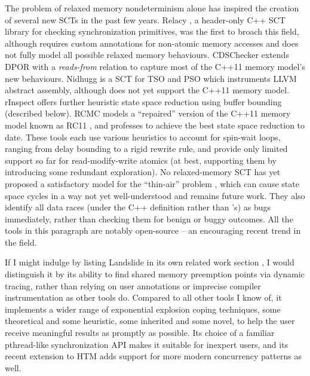 The problem of relaxed memory nondeterminism alone has inspired the creation of several new SCTs in the past few years.
Relacy \cite{relacy}, a header-only C++ SCT library for checking synchronization primitives,
was the first to broach this field,
although requires custom annotations for non-atomic memory accesses
and
does not fully model all possible relaxed memory behaviours.
CDSChecker \cite{cdschecker} extends DPOR with a {\em reads-from} relation
to capture most of the C++11 memory model's new behaviours.
Nidhugg \cite{nidhugg} is a SCT for TSO and PSO which instruments LLVM abstract assembly,
although does not yet support the C++11 memory model.
rInspect \cite{tsopso}
offers further heuristic state space reduction using buffer bounding (described below).
RCMC \cite{rcmc} models a ``repaired'' version of the C++11 memory model known as RC11 \cite{rc11},
and professes to achieve the best state space reduction to date.
These tools each use various heuristics to account for spin-wait loops,
ranging from delay bounding \cite{bpor} to a rigid rewrite rule,
and provide only limited support so far for read-modify-write atomics
(at best, supporting them by introducing %
some redundant exploration).
%
No relaxed-memory SCT has yet proposed a satisfactory model for the ``thin-air'' problem \cite{sully-thesis},
which can cause state space cycles in a way not yet well-understood and remains future work.
They also identify all data races
(under the C++ definition rather than \sect{\ref{sec:quicksand-soundness}}'s)
as bugs immediately, rather than checking them for benign or buggy outcomes.
All the tools in this paragraph are notably open-source -- an encouraging recent trend in the field.

If I might indulge by listing Landslide in its own related work section \cite{this-thesis},
I would distinguish it by its ability to find shared memory preemption points via dynamic tracing,
rather than relying on user annotations or imprecise compiler instrumentation
as other tools do.
Compared to all other tools I know of,
it implements a wider range of exponential explosion coping techniques,
some theoretical and some heuristic,
some inherited and some novel,
to help the user receive meaningful results as promptly as possible.
Its choice of a familiar pthread-like synchronization API makes it suitable for inexpert users,
and its recent extension to HTM adds support for more modern concurrency patterns as well.

